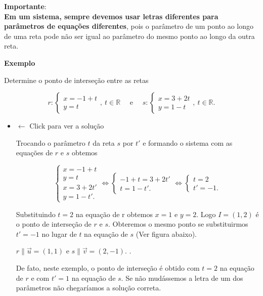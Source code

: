 \documentclass[
  brazilian,
  letterpaper,
  DIV=11,
  numbers=noendperiod]{scrreprt}
\theoremstyle{definition}
\theoremstyle{plain}
\theoremstyle{definition}
\theoremstyle{remark}
\begin{document}
\textbf{Importante}:\\
\textbf{Em um sistema, sempre devemos usar letras diferentes para
parâmetros de equações diferentes}, pois o parâmetro de um ponto ao
longo de uma reta pode não ser igual ao parâmetro do mesmo ponto ao
longo da outra reta.

\textbf{Exemplo}

Determine o ponto de interseção entre as retas

\[
 r:\left\{
\begin{array}{l}
x = -1 +  t \\
y =         t
\end{array}
\right., \ t\in\mathbb{R} \quad \text{ e } \quad s:\left\{
\begin{array}{l}
x = 3 +2  t \\
y = 1 -  t
\end{array}
\right., \ t\in\mathbb{R}.
\]

\begin{itemize}
\item
  \(\leftarrow\) Click para ver a solução

  Trocando o parâmetro \(t\) da reta \(s\) por \(t'\) e formando o
  sistema com as equações de \(r\) e \(s\) obtemos

  \[
    \left\{
    \begin{array}{l}x=-1+t \\
    y=   t \\
    x = 3+2t' \\
    y = 1 - t'.
    \end{array}
    \right. \Leftrightarrow  \left\{
    \begin{array}{l} -1+t = 3+2t' \\
    t  = 1 - t'.
    \end{array}
    \right.  \Leftrightarrow  \left\{
    \begin{array}{l}  t = 2 \\
    t'  = -1.
    \end{array}
    \right.
    \]

  Substituindo \(t=2\) na equação de r obtemos \(x=1\) e \(y=2\). Logo
  \(I=(1,2)\) é o ponto de interseção de \(r\) e \(s\). Obteremos o
  mesmo ponto se substituirmos \(t'=-1\) no lugar de \(t\) na equação de
  \(s\) (Ver figura abaixo).

  \(r\parallel\vec{u}=(1,1)\) e \(s\parallel\vec{v}=(2,-1)\). .

  De fato, neste exemplo, o ponto de interseção é obtido com \(t=2\) na
  equação de \(r\) e com \(t'=1\) na equação de \(s\). Se não mudássemos
  a letra de um dos parâmetros não chegaríamos a solução correta.
\end{itemize}
\end{document}
